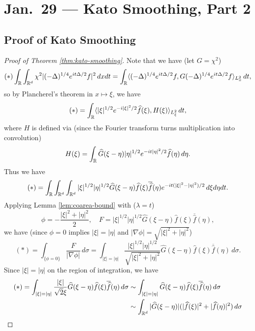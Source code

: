 \chapter{Jan.~29 --- Kato Smoothing, Part 2}

\section{Proof of Kato Smoothing}

\begin{proof}[Proof of Theorem \ref{thm:kato-smoothing}]
  Note that we have
  (let $G = \chi^2$)
  \[
    (*) \int_{\mathbb{R}} \int_{\mathbb{R}^d}
    \chi^2 |(-\Delta)^{1 / 4} e^{it \Delta / 2} f|^2\, dx dt
    = \int_{\mathbb{R}} \langle (-\Delta)^{1 / 4} e^{i t \Delta / 2} f, G (-\Delta)^{1 / 4} e^{it \Delta / 2} f \rangle_{L^2_x} \, dt,
  \]
  so by Plancherel's theorem in $x \mapsto \xi$, we have
  \[
    (*)
    = \int_{\mathbb{R}} \langle |\xi|^{1 / 2} e^{-i |\xi|^2 / 2} \widehat{f}(\xi), H(\xi) \rangle_{L^2_\xi} \, dt,
  \]
  where $H$ is defined via (since the Fourier
  transform turns multiplication into convolution)
  \[
    H(\xi) = \int_{\mathbb{R}} \widehat{G}(\xi - \eta) |\eta|^{1 / 2} e^{-i t |\eta|^2 / 2} \widehat{f}(\eta)\, d\eta.
  \]
  Thus we have
  \[
    (*)
    = \int_{\mathbb{R}} \int_{\mathbb{R}^d} \int_{\mathbb{R}^d}
    |\xi|^{1 / 2} |\eta|^{1 / 2} \widehat{G}(\xi - \eta)
    \widehat{f}(\xi) \overline{\widehat{f}}(\eta)
    e^{-it(|\xi|^2 - |\eta|^2) / 2}\, d\xi d\eta dt
  .\]
  Applying Lemma \ref{lem:coarea-bound} with
  ($\lambda = t$)
  \[
    \phi = - \frac{|\xi|^2 + |\eta|^2}{2}, \quad
    F = |\xi|^{1 / 2} |\eta|^{1 / 2} \widehat{G}(\xi - \eta) \widehat{f}(\xi) \overline{\widehat{f}}(\eta),
  \]
  we have (since $\phi = 0$ implies
  $|\xi| = |\eta|$ and $|\nabla \phi| = \sqrt{|\xi|^2 + |\eta|^2}$)
  \[
    (*) = \int_{\{\phi = 0\}} \frac{F}{|\nabla \phi|}\, d\sigma
    = \int_{|\xi| = |\eta|} \frac{|\xi|^{1 / 2} |\eta|^{1 / 2}}{\sqrt{|\xi|^2 + |\eta|^2}} \widehat{G}(\xi - \eta) \widehat{f}(\xi) \overline{\widehat{f}}(\eta)\, d\sigma.
  \]
  Since $|\xi| = |\eta|$ on the region of integration,
  we have
  \begin{align*}
    (*) = \int_{|\xi| = |\eta|}
    \frac{|\xi|}{\sqrt{2}\xi} \widehat{G}(\xi - \eta) \widehat{f}(\xi) \overline{\widehat{f}}(\eta)\, d\sigma
    &\sim \int_{|\xi| = |\eta|}
    \widehat{G}(\xi - \eta) \widehat{f}(\xi) \overline{\widehat{f}}(\eta)\, d\sigma \\
    &\sim
    \int_{\R^d} |\widehat{G}(\xi - \eta)| (|\widehat{f}(\xi)|^2 + |\widehat{f}(\eta)|^2) \, d\sigma \\

\end{align*}
\end{proof}

